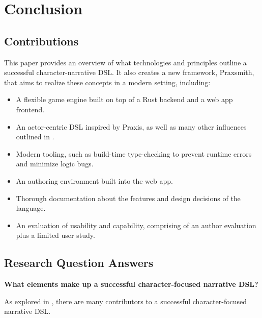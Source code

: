 \chapter{Conclusion} \label{sec:Conclusion}

\section{Contributions} \label{sec:Contributions}

This paper provides an overview of what technologies and principles outline
a successful character-narrative DSL. It also creates a new framework, Praxsmith, that
aims to realize these concepts in a modern setting, including:

\begin{itemize}
    \item A flexible game engine built on top of a Rust backend and a web app frontend.
    \item An actor-centric DSL inspired by Praxis, as well as many other influences
    outlined in .
    \item Modern tooling, such as build-time type-checking to prevent runtime errors
    and minimize logic bugs.
    \item An authoring environment built into the web app.
    \item Thorough documentation about the features and design decisions of the
    language.
    \item An evaluation of usability and capability, comprising of an author evaluation
    plus a limited user study.
\end{itemize}

\section{Research Question Answers} \label{sec:ResearchQuestionAnswers}

\textbf{What elements make up a successful character-focused narrative DSL?}

As explored in , there are many contributors to a
successful character-focused narrative DSL.

